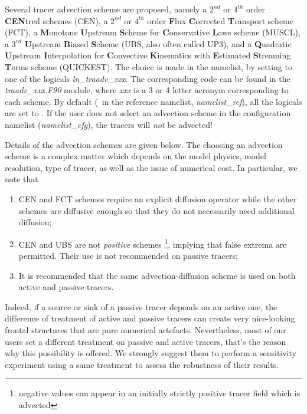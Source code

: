 \documentclass[../main/NEMO_manual]{subfiles}
\begin{document}
Several tracer advection scheme are proposed,
namely a $2^{nd}$ or $4^{th}$ order \textbf{CEN}tred schemes (CEN),
a $2^{nd}$ or $4^{th}$ order \textbf{F}lux \textbf{C}orrected \textbf{T}ransport scheme (FCT),
a \textbf{M}onotone \textbf{U}pstream \textbf{S}cheme for
\textbf{C}onservative \textbf{L}aws scheme (MUSCL),
a $3^{rd}$ \textbf{U}pstream \textbf{B}iased \textbf{S}cheme (UBS, also often called UP3),
and a \textbf{Q}uadratic \textbf{U}pstream \textbf{I}nterpolation for
\textbf{C}onvective \textbf{K}inematics with
\textbf{E}stimated \textbf{S}treaming \textbf{T}erms scheme (QUICKEST).
The choice is made in the  namelist,
by setting to  one of the logicals \textit{ln\_traadv\_xxx}.
The corresponding code can be found in the \textit{traadv\_xxx.F90} module,
where \textit{xxx} is a 3 or 4 letter acronym corresponding to each scheme.
By default (\ie\ in the reference namelist, \textit{namelist\_ref}),
all the logicals are set to .
If the user does not select an advection scheme in the configuration namelist
(\textit{namelist\_cfg}), the tracers will \textit{not} be advected!

Details of the advection schemes are given below.
The choosing an advection scheme is a complex matter which depends on the
model physics, model resolution, type of tracer, as well as the issue of numerical cost.
In particular, we note that

\begin{enumerate}
\item CEN and FCT schemes require an explicit diffusion operator while
  the other schemes are diffusive enough so that they do not necessarily need additional diffusion;
\item CEN and UBS are not \textit{positive} schemes \footnote{negative values can appear in
    an initially strictly positive tracer field which is advected},
  implying that false extrema are permitted.
  Their use is not recommended on passive tracers;
\item It is recommended that the same advection-diffusion scheme is used on
  both active and passive tracers.
\end{enumerate}

Indeed, if a source or sink of a passive tracer depends on an active one,
the difference of treatment of active and passive tracers can create
very nice-looking frontal structures that are pure numerical artefacts.
Nevertheless, most of our users set a different treatment on passive and active tracers,
that's the reason why this possibility is offered.
We strongly suggest them to perform a sensitivity experiment using a same treatment to
assess the robustness of their results.
\end{document}
